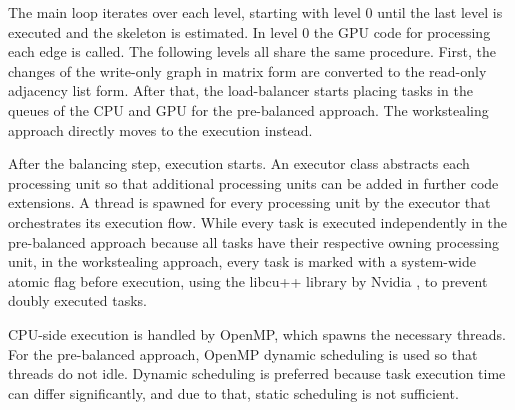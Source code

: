 The main loop iterates over each level, starting with level 0 until the last level is executed and the skeleton is estimated. In level 0 the GPU code for processing each edge is called. The following levels all share the same procedure. First, the changes of the write-only graph in matrix form are converted to the read-only adjacency list form. After that, the load-balancer starts placing tasks in the queues of the CPU and GPU for the pre-balanced approach. The workstealing approach directly moves to the execution instead.

After the balancing step, execution starts. An executor class abstracts each processing unit so that additional processing units can be added in further code extensions. A thread is spawned for every processing unit by the executor that orchestrates its execution flow. While every task is executed independently in the pre-balanced approach because all tasks have their respective owning processing unit, in the workstealing approach, every task is marked with a system-wide atomic flag before execution, using the libcu++ library by Nvidia \cite{NVIDIALibcudacxx2021}, to prevent doubly executed tasks.

CPU-side execution is handled by OpenMP, which spawns the necessary threads. For the pre-balanced approach, OpenMP dynamic scheduling is used so that threads do not idle. Dynamic scheduling is preferred because task execution time can differ significantly, and due to that, static scheduling is not sufficient.

